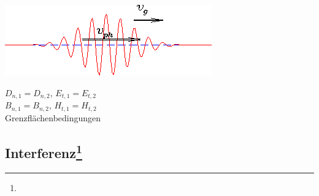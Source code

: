 \documentclass[12pt,a4paper]{article}
\renewcommand{\=}[1]{\stackrel{#1}{=}}
\theoremstyle{definition}
\theoremstyle{remark}
\begin{document}
\begin{center}
\begin{minipage}[t]{.49\linewidth}
\includegraphics[width=\linewidth]{pic/vphvgr.png}
\begin{center}
\begin{framed}
$D_{n,1} = D_{n,2}$, $E_{t,1} = E_{t,2}$\\
$B_{n,1} = B_{n,2}$, $H_{t,1} = H_{t,2}$\\
Grenzflächenbedingungen
\end{framed}
\end{center}
\end{minipage}
\end{center}


\subsection[Interferenz]{Interferenz\let\thefootnote\relax\footnote{}}
\end{document}
